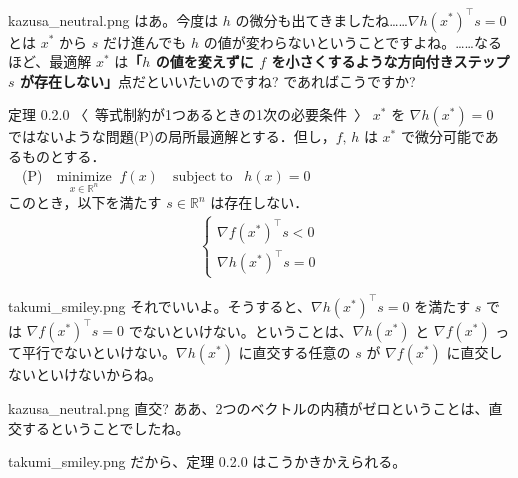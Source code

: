 \documentclass[b5paper,xelatex,ja=standard,10pt]{bxjsarticle}
\begin{document}
\begin{SERIFU}[colback=PaleIris, colbacktitle=PaleIris2]{kazusa_neutral.png}
はあ。今度は $h$ の微分も出てきましたね……$\nabla h(x^\ast)^\top s = 0$ とは $x^\ast$ から $s$ だけ進んでも $h$ の値が変わらないということですよね。……なるほど、最適解 $x^\ast$ は\textbf{「$h$ の値を変えずに $f$ を小さくするような方向付きステップ $s$ が存在しない」}点だといいたいのですね? であればこうですか?
\end{SERIFU}

\begin{PROP}[colback=White]{定理 0.2.0 〈\, 等式制約が1つあるときの1次の必要条件 \,〉}
$x^\ast$ を $\nabla h(x^\ast) = 0$ ではないような問題(P)の局所最適解とする．但し，$f, \, h$ は $x^\ast$ で微分可能であるものとする．
\\[5pt]
　(P)　$\displaystyle \underset{x \in \mathbb{R}^n}{\mathrm{minimize}} \; \; f(x) \quad  \mathrm{subject \; to}   \; \; \; h(x) = 0$
\\[5pt]
このとき，以下を満たす $s \in \mathbb{R}^n$ は存在しない．
\begin{eqnarray*}
\left\{
\begin{array}{l}
\nabla f(x^\ast)^\top s < 0
\\[5pt]
\nabla h(x^\ast)^\top s = 0
\end{array}
\right.
\end{eqnarray*}
\end{PROP}

\begin{SERIFU}[colback=PaleGold, colbacktitle=PaleGold2]{takumi_smiley.png}
それでいいよ。そうすると、$\nabla h(x^\ast)^\top s = 0$ を満たす $s$ では $\nabla f(x^\ast)^\top s = 0$ でないといけない。ということは、$\nabla h(x^\ast)$ と $\nabla f(x^\ast)$ って平行でないといけない。$\nabla h(x^\ast)$ に直交する任意の $s$ が $\nabla f(x^\ast)$ に直交しないといけないからね。
\end{SERIFU}

\begin{SERIFU}[colback=PaleIris, colbacktitle=PaleIris2]{kazusa_neutral.png}
直交? ああ、2つのベクトルの内積がゼロということは、直交するということでしたね。
\end{SERIFU}

\begin{SERIFU}[colback=PaleGold, colbacktitle=PaleGold2]{takumi_smiley.png}
だから、定理 0.2.0 はこうかきかえられる。
\end{SERIFU}
\end{document}
